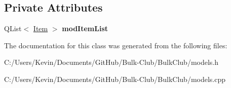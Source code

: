 \subsection*{Private Attributes}
\begin{DoxyCompactItemize}
\item 
\mbox{\label{class_item_model_ad6380d5a1a6268a82ff22cda344f12ec}} 
Q\+List$<$ \mbox{\hyperlink{class_item}{Item}} $>$ {\bfseries mod\+Item\+List}
\end{DoxyCompactItemize}


The documentation for this class was generated from the following files\+:\begin{DoxyCompactItemize}
\item 
C\+:/\+Users/\+Kevin/\+Documents/\+Git\+Hub/\+Bulk-\/\+Club/\+Bulk\+Club/models.\+h\item 
C\+:/\+Users/\+Kevin/\+Documents/\+Git\+Hub/\+Bulk-\/\+Club/\+Bulk\+Club/models.\+cpp\end{DoxyCompactItemize}
